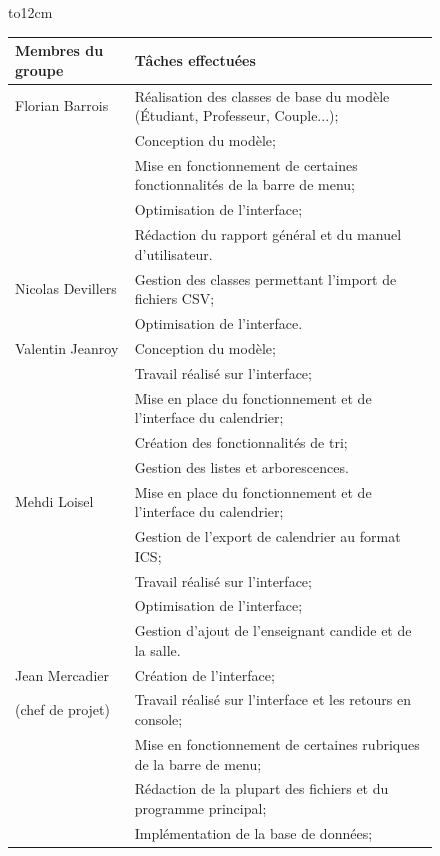 \documentclass[a4paper,10pt]{report}
\begin{document}
      \begin{figure}[H]
	\hbox to12cm{\hss
	  \begin{tabular}{|l|l|}
	    \hline
	    \textbf{Membres du groupe} & \textbf{Tâches effectuées} \\
	    \hline
	      Florian Barrois 
	      & Réalisation des classes de base du modèle (Étudiant, Professeur, Couple...); \\
	      & Conception du modèle; \\
	      & Mise en fonctionnement de certaines fonctionnalités de la barre de menu;\\
	      & Optimisation de l'interface;\\
	      & Rédaction du rapport général et du manuel d'utilisateur.\\
	    \hline
	      Nicolas Devillers 
	      & Gestion des classes permettant l'import de fichiers CSV;\\
	      & Optimisation de l'interface.\\
	      \hline
	      Valentin Jeanroy 
	      & Conception du modèle; \\
	      & Travail réalisé sur l'interface;\\
	      & Mise en place du fonctionnement et de l'interface du calendrier;\\
	      & Création des fonctionnalités de tri;\\
	      & Gestion des listes et arborescences.\\
	      \hline
	      Mehdi Loisel 
	      & Mise en place du fonctionnement et de l'interface du calendrier; \\
	      & Gestion de l'export de calendrier au format ICS;\\
	      & Travail réalisé sur l'interface;\\
	      & Optimisation de l'interface;\\
	      & Gestion d'ajout de l'enseignant candide et de la salle.\\
	      \hline
	      Jean Mercadier
	      & Création de l'interface; \\
	      (chef de projet)& Travail réalisé sur l'interface et les retours en console;\\
	      & Mise en fonctionnement de certaines rubriques de la barre de menu;\\
	      & Rédaction de la plupart des fichiers et du programme principal;\\
	      & Implémentation de la base de données;\\

\end{tabular}}
\end{figure}
\end{document}
